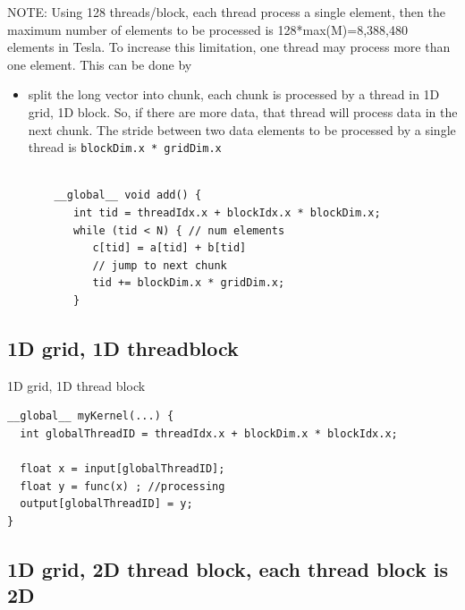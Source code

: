   NOTE: Using 128 threads/block, each thread process a single element, then the
  maximum number of elements to be processed is 128*max(M)=8,388,480 elements in
  Tesla. To increase this limitation, one thread may process more than one
  element. This can be done by 
  \begin{itemize}
    \item split the long vector into chunk, each
    chunk is processed by a thread in 1D grid, 1D block. So, if there are more
    data, that thread will process data in the next chunk. The stride between
    two data elements to be processed by a single thread is 
    \verb!blockDim.x * gridDim.x!
    \begin{lstlisting}
    
    __global__ void add() {
       int tid = threadIdx.x + blockIdx.x * blockDim.x;
       while (tid < N) { // num elements
          c[tid] = a[tid] + b[tid]
          // jump to next chunk
          tid += blockDim.x * gridDim.x;
       }
    \end{lstlisting}
  \end{itemize}
  

\subsection{1D grid, 1D threadblock}

1D grid, 1D thread block
\begin{lstlisting}
__global__ myKernel(...) {
  int globalThreadID = threadIdx.x + blockDim.x * blockIdx.x;

  float x = input[globalThreadID];
  float y = func(x) ; //processing
  output[globalThreadID] = y;
}
\end{lstlisting}

\subsection{1D grid, 2D thread block, each thread block is 2D}

